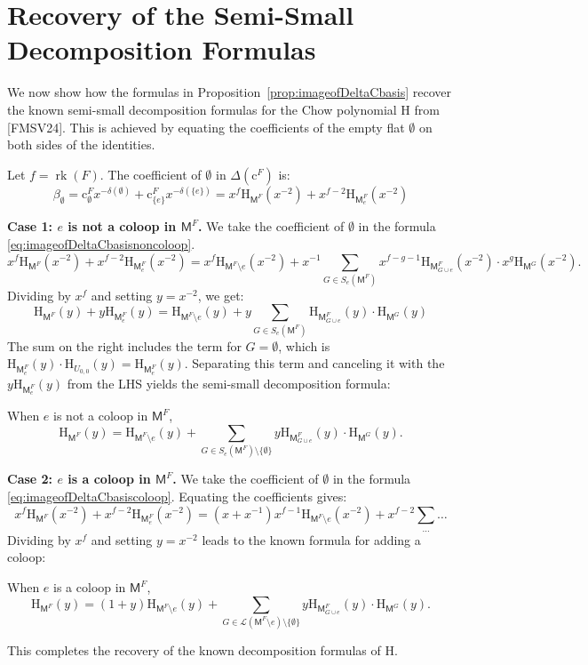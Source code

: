 \documentclass[12pt,letterpaper,english]{amsart}
\theoremstyle{teoremas}
\theoremstyle{definition}
\newcommand{\M}{\mathsf{M}}
\newcommand{\rank}{\operatorname{rk}}
\renewcommand{\H}{\mathrm{H}}
\newcommand{\Ebasis}[1]{\mathrm{#1}}
\newcommand{\Cbasis}[1]{\mathrm{c}^{#1}}
\newcommand{\CbasisSub}[2]{\mathrm{c}^{#1}_{#2}}
\begin{document}
\section{Recovery of the Semi-Small Decomposition Formulas}

We now show how the formulas in Proposition~\ref{prop:imageofDeltaCbasis} recover the known
semi-small decomposition formulas for the Chow polynomial \(\H\) from [FMSV24]. This
is achieved by equating the coefficients of the empty flat \(\Ebasis{\emptyset}\) on both sides of the identities.

Let \(f = \rank(F)\). The coefficient of \(\Ebasis{\emptyset}\) in \(\Delta(\Cbasis{F})\) is:
\[ \beta_\emptyset = \CbasisSub{F}{\emptyset}x^{-\delta(\emptyset)} + \CbasisSub{F}{\{e\}}x^{-\delta(\{e\})} = x^f \H_{\M^F}(x^{-2}) + x^{f-2}\H_{\M^F_e}(x^{-2}) \]

\textbf{Case 1: \(e\) is not a coloop in \(\M^F\).}
We take the coefficient of \(\Ebasis{\emptyset}\) in the formula \eqref{eq:imageofDeltaCbasisnoncoloop}.
\[ x^{f}\H_{\M^F}(x^{-2}) + x^{f-2}\H_{\M^F_e}(x^{-2}) = x^{f}\H_{\M^F\setminus e}(x^{-2}) +
    x^{-1}\sum_{G \in S_e(\M^F)}x^{f-g-1}\H_{\M^F_{G\cup e}}(x^{-2})\cdot x^g\H_{\M^G}(x^{-2}). \]
Dividing by \(x^f\) and setting \(y=x^{-2}\), we get:
\[ \H_{\M^F}(y) + y\H_{\M^F_e}(y) = \H_{\M^F\setminus e}(y) + y\sum_{G \in S_e(\M^F)}\H_{\M^F_{G\cup e}}(y)\cdot \H_{\M^G}(y)\]
The sum on the right includes the term for \(G=\emptyset\), which is \(\H_{\M^F_e}(y) \cdot \H_{U_{0,0}}(y) = \H_{\M^F_e}(y)\). Separating this term and canceling it with the \(y\H_{\M^F_e}(y)\) from the LHS yields the semi-small decomposition formula:
\begin{center}
    When \(e\) is not a coloop in \(\M^F\),
    \begin{equation} \label{eq:semi-small-decomposition-noncoloop}
        \H_{\M^F}(y) = \H_{\M^F\setminus e}(y) + \sum_{G \in S_e(\M^F)\setminus\{\emptyset\}} y \H_{\M^F_{G\cup e}}(y) \cdot \H_{\M^G}(y).
    \end{equation}
\end{center}

\textbf{Case 2: \(e\) is a coloop in \(\M^F\).}
We take the coefficient of \(\Ebasis{\emptyset}\) in the formula \eqref{eq:imageofDeltaCbasiscoloop}.
Equating the coefficients gives:
\[ x^f \H_{\M^F}(x^{-2}) + x^{f-2}\H_{\M^F_e}(x^{-2}) = (x+x^{-1})x^{f-1}\H_{\M^F\setminus e}(x^{-2}) + x^{f-2}\sum_{\dots} \dots \]
Dividing by \(x^f\) and setting \(y=x^{-2}\) leads to the known formula for adding a coloop:
\begin{center}
    When \(e\) is a coloop in \(\M^F\),
    \begin{equation} \label{eq:semi-small-decomposition-coloop}
        \H_{\M^F}(y) = (1+y)\H_{\M^F\setminus e}(y) +
        \sum_{G \in \mathcal{L}(\M^F\setminus e)\setminus\{\emptyset\}}y \H_{\M^F_{G\cup e}}(y) \cdot
        \H_{\M^G}(y).
    \end{equation}
\end{center}
This completes the recovery of the known decomposition formulas of \(\H\).
\end{document}
